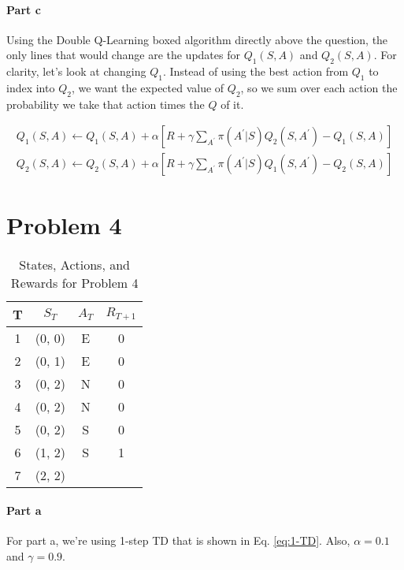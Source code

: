 \documentclass[12pt]{article}
\begin{document}
\paragraph{Part c}

Using the Double Q-Learning boxed algorithm directly above the question, the only lines that would change are the updates for $Q_1(S, A)$ and $Q_2(S, A)$. For clarity, let's look at changing $Q_1$. Instead of using the best action from $Q_1$ to index into $Q_2$, we want the expected value of $Q_2$, so we sum over each action the probability we take that action times the $Q$ of it.

\begin{gather*}
  Q_1(S, A) \gets Q_1(S, A) + \alpha [R + \gamma \sum_{A^\prime} \pi(A^\prime | S) Q_2(S, A^\prime) - Q_1(S, A)] \\
  Q_2(S, A) \gets Q_2(S, A) + \alpha [R + \gamma \sum_{A^\prime} \pi(A^\prime | S) Q_1(S, A^\prime) - Q_2(S, A)]
\end{gather*}

\section{Problem 4}

\begin{table}[!htb]
  \centering
  \caption{States, Actions, and Rewards for Problem 4}
  \label{tab:4}
  \begin{tabular}{|c|c|c|c|}
    \hline
    T & $S_T$  & $A_T$ & $R_{T+1}$ \\ \hline
    1 & (0, 0) & E     & 0         \\ \hline
    2 & (0, 1) & E     & 0         \\ \hline
    3 & (0, 2) & N     & 0         \\ \hline
    4 & (0, 2) & N     & 0         \\ \hline
    5 & (0, 2) & S     & 0         \\ \hline
    6 & (1, 2) & S     & 1         \\ \hline
    7 & (2, 2) &       &           \\ \hline
  \end{tabular}
\end{table}

\paragraph{Part a}

For part a, we're using 1-step TD that is shown in Eq. \ref{eq:1-TD}. Also, $\alpha = 0.1$ and $\gamma = 0.9$.
\end{document}
